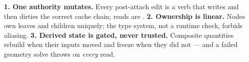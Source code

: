 \documentclass[11pt,letterpaper]{article}
\begin{document}
\vspace{0.5em}
\begin{designrule}
\textbf{1. One authority mutates.} Every post-attach edit is a  verb that writes
and then dirties the correct cache chain; reads are . \textbf{2. Ownership is linear.}
Nodes own leaves and children uniquely; the type system, not a runtime check, forbids aliasing.
\textbf{3. Derived state is gated, never trusted.} Composite quantities rebuild when their inputs
moved and freeze when they did not --- and a failed geometry solve throws on \emph{every} read.
\end{designrule}

\clearpage
\tableofcontents
\clearpage
{}















\clearpage
\appendix


\end{document}

